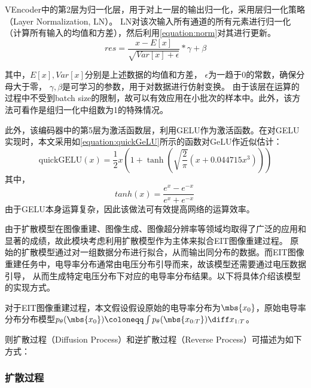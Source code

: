 VEncoder中的第2层为归一化层，用于对上一层的输出归一化，采用层归一化策略（Layer Normalization, LN）。
LN对该次输入所有通道的所有元素进行归一化（计算所有输入的均值和方差），然后利用\cref{equation:norm}对其进行更新。
\begin{equation}
  \label{equation:norm}
  res = \frac{x - E\left[ x\right]}{\sqrt{Var\left[ x\right] + \epsilon}} * \gamma + \beta
\end{equation}

其中，$E\left[ x\right], Var\left[ x\right]$分别是上述数据的均值和方差， $\epsilon$为一趋于0的常数，确保分母大于零，
$\gamma, \beta$是可学习的参数，用于对数据进行仿射变换。
由于该层在运算的过程中不受到batch size的限制，故可以有效应用在小批次的样本中。此外，该方法可看作是组归一化中组数为1的特殊情况。


此外，该编码器中的第5层为激活函数层，利用GELU作为激活函数。在对GELU实现时，本文采用如\cref{equation:quickGeLU}所示的函数对GeLU作近似估计：
  \begin{equation}
    \label{equation:quickGeLU}
    \text{quickGELU}(x) = \frac{1}{2}x\left(1 + \tanh\left(\sqrt{\frac{2}{\pi}}\left(x + 0.044715x^3\right)\right)\right)
  \end{equation}
  其中，
  \begin{equation}
    tanh(x) = \frac{{e^{x} - e^{-x}}}{{e^{x} + e^{-x}}}
\
  \end{equation}
由于GELU本身运算复杂，因此该做法可有效提高网络的运算效率。






由于扩散模型在图像重建、图像生成、图像超分辨率等领域均取得了广泛的应用和显著的成绩，故此模块考虑利用扩散模型作为主体来拟合EIT图像重建过程。
原始的扩散模型通过对一组数据分布进行拟合，从而输出同分布的数据。而EIT图像重建任务中，电导率分布通常由电压分布引导而来，故该模型还需要通过电压数据引导，
从而生成特定电压分布下对应的电导率分布结果。以下将具体介绍该模型的实现方式。

对于EIT图像重建过程，本文假设假设原始的电导率分布为$\mbs{x_0}$，原始电导率分布分布模型$p_\theta(\mbs{x_0}) \coloneqq \int p_\theta(\mbs{x_{0:T}})\diff x_{1:T}$。

则扩散过程（Diffusion Process）和逆扩散过程（Reverse Process）可描述为如下方式：

\subsubsection{扩散过程}

